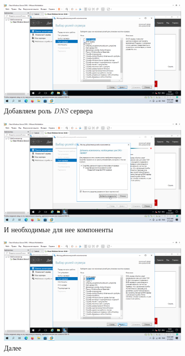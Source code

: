 \documentclass[a4paper]{article}
\begin{document}
  \begin{figure}[H]
    \centering
    \includegraphics[width=0.85\textwidth]{9_0036}
    \caption{Добавляем роль \textit{DNS} сервера}
    \label{img:0036}
  \end{figure}

  \begin{figure}[H]
    \centering
    \includegraphics[width=0.85\textwidth]{9_0037}
    \caption{И необходимые для нее компоненты}
    \label{img:0037}
  \end{figure}

  \begin{figure}[H]
    \centering
    \includegraphics[width=0.85\textwidth]{9_0038}
    \caption{Далее}
    \label{img:0038}
  \end{figure}
\end{document}
